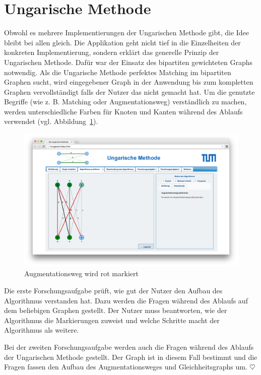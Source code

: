 \section{Ungarische Methode} %
Obwohl es mehrere Implementierungen der Ungarischen Methode gibt, die Idee bleibt bei allen gleich. Die Applikation geht nicht tief in die Einzelheiten der konkreten Implementierung, sondern erklärt das generelle Prinzip der Ungarischen Methode. Dafür war der Einsatz des bipartiten gewichteten Graphs notwendig. Als die Ungarische Methode perfektes Matching im bipartiten Graphen sucht, wird eingegebener Graph in der Anwendung bis zum kompletten Graphen vervollständigt falls der Nutzer das nicht gemacht hat. Um die genutzte Begriffe (wie z. B. Matching oder Augmentationsweg) verständlich zu machen, werden unterschiedliche Farben für Knoten und Kanten während des Ablaufs verwendet (vgl. Abbildung~\ref{fig:hungarian-colors}).
\begin{figure}[h!]
	\centering
	\includegraphics[width=\textwidth]{figures/hungarian-colors}
	\caption[Ungarische Methode: Augmentationsweg]{Augmentationsweg wird rot markiert}\label{fig:hungarian-colors}
\end{figure}

Die erste Forschungsaufgabe prüft, wie gut der Nutzer den Aufbau des Algorithmus verstanden hat. Dazu werden die Fragen während des Ablaufs auf dem beliebigen Graphen gestellt. Der Nutzer muss beantworten, wie der Algorithmus die Markierungen zuweist und welche Schritte macht der Algorithmus als weitere. 

Bei der zweiten Forschungsaufgabe werden auch die Fragen während des Ablaufs der Ungarischen Methode gestellt. Der Graph ist in diesem Fall bestimmt und die Fragen fassen den Aufbau des Augmentationsweges und Gleichheitsgraphs um. \hfill$\heartsuit$

